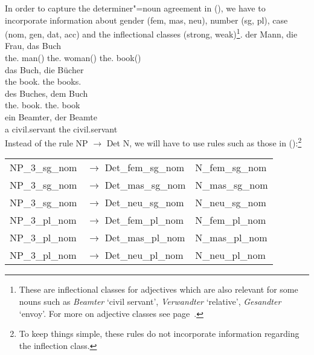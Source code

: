 In order to capture the determiner"=noun agreement in (), we have to incorporate information about gender (fem, mas, neu),
number (sg, pl), case (nom, gen, dat, acc) and the inflectional classes (strong, weak)\footnote{
These are inflectional classes for adjectives which are also relevant for some nouns such as \emph{Beamter} `civil servant', 
\emph{Verwandter} `relative', \emph{Gesandter} `envoy'.
For more on adjective classes see page~\pageref{page-Flexionsklasse-Wunderlich}.%
}.
\eal\settowidth{}
\ex 
\gll der Mann, die Frau, das Buch\\
	 the.\mas{} man(\mas) the.\fem{} woman(\fem) the.\neu{} book(\neu)\\
\ex 
\gll das Buch, die Bücher\\
	 the book.\sg{} the books.\pl\\
\ex 
\gll des Buches, dem Buch\\
	 the.\gen{} book.\gen{} the.\dat{} book\\
\ex{} 
\gll ein Beamter, der Beamte\\
	 a civil.servant the civil.servant\\
\zl
\addlines         
Instead of the rule NP $\to$ Det N, we will have to use rules such as those in ():\footnote{
  To keep things simple, these rules do not incorporate information regarding the inflection class.
}
\ea
\begin{tabular}[t]{@{}l@{ }l@{~~}l}
NP\_3\_sg\_nom  & $\to$ Det\_fem\_sg\_nom & N\_fem\_sg\_nom \\
NP\_3\_sg\_nom  & $\to$ Det\_mas\_sg\_nom & N\_mas\_sg\_nom \\
NP\_3\_sg\_nom  & $\to$ Det\_neu\_sg\_nom & N\_neu\_sg\_nom \\
NP\_3\_pl\_nom  & $\to$ Det\_fem\_pl\_nom & N\_fem\_pl\_nom \\
NP\_3\_pl\_nom  & $\to$ Det\_mas\_pl\_nom & N\_mas\_pl\_nom \\
NP\_3\_pl\_nom  & $\to$ Det\_neu\_pl\_nom & N\_neu\_pl\_nom \\[2mm]
\end{tabular}


